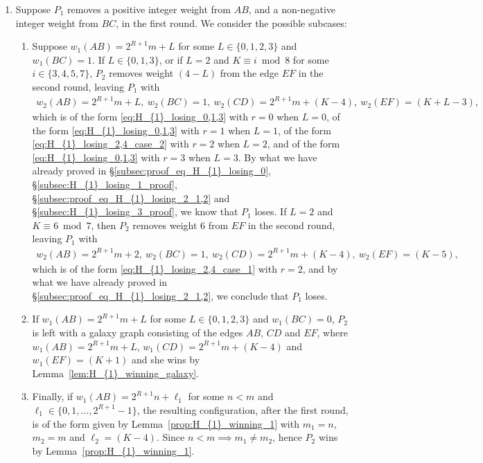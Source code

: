 \documentclass[11pt,reqno]{amsart}
\theoremstyle{definition}
\theoremstyle{definition}
\begin{document}
\begin{enumerate}
\item Suppose $P_{1}$ removes a positive integer weight from $AB$, and a non-negative integer weight from $BC$, in the first round. We consider the possible subcases:
\begin{enumerate}
\item Suppose $w_{1}(AB)=2^{R+1}m+L$ for some $L \in \{0,1,2,3\}$ and $w_{1}(BC)=1$. If $L \in \{0,1,3\}$, or if $L=2$ and $K \equiv i \bmod 8$ for some $i \in \{3,4,5,7\}$, $P_{2}$ removes weight $(4-L)$ from the edge $EF$ in the second round, leaving $P_{1}$ with
\begin{align}
w_{2}(AB)=2^{R+1}m+L,\ w_{2}(BC)=1,\ w_{2}(CD)=2^{R+1}m+(K-4),\ w_{2}(EF)=(K+L-3),\nonumber
\end{align}
which is of the form \eqref{eq:H_{1}_losing_0,1,3} with $r=0$ when $L=0$, of the form \eqref{eq:H_{1}_losing_0,1,3} with $r=1$ when $L=1$, of the form \eqref{eq:H_{1}_losing_2,4_case_2} with $r=2$ when $L=2$, and of the form \eqref{eq:H_{1}_losing_0,1,3} with $r=3$ when $L=3$. By what we have already proved in \S\ref{subsec:proof_eq_H_{1}_losing_0}, \S\ref{subsec:H_{1}_losing_1_proof}, \S\ref{subsec:proof_eq_H_{1}_losing_2_1,2} and \S\ref{subsec:H_{1}_losing_3_proof}, we know that $P_{1}$ loses. If $L=2$ and $K \equiv 6 \bmod 7$, then $P_{2}$ removes weight $6$ from $EF$ in the second round, leaving $P_{1}$ with
\begin{align}
w_{2}(AB)=2^{R+1}m+2,\ w_{2}(BC)=1,\ w_{2}(CD)=2^{R+1}m+(K-4),\ w_{2}(EF)=(K-5),\nonumber
\end{align}
which is of the form \eqref{eq:H_{1}_losing_2,4_case_1} with $r=2$, and by what we have already proved in \S\ref{subsec:proof_eq_H_{1}_losing_2_1,2}, we conclude that $P_{1}$ loses.

\item If $w_{1}(AB)=2^{R+1}m+L$ for some $L \in \{0,1,2,3\}$ and $w_{1}(BC)=0$, $P_{2}$ is left with a galaxy graph consisting of the edges $AB$, $CD$ and $EF$, where $w_{1}(AB)=2^{R+1}m+L$, $w_{1}(CD)=2^{R+1}m+(K-4)$ and $w_{1}(EF)=(K+1)$ and she wins by Lemma~\ref{lem:H_{1}_winning_galaxy}.

\item Finally, if $w_{1}(AB)=2^{R+1}n+\ell_{1}$ for some $n < m$ and $\ell_{1} \in \{0,1,\ldots,2^{R+1}-1\}$, the resulting configuration, after the first round, is of the form given by Lemma~\ref{prop:H_{1}_winning_1} with $m_{1}=n$, $m_{2}=m$ and $\ell_{2}=(K-4)$. Since $n<m \implies m_{1}\neq m_{2}$, hence $P_{2}$ wins by Lemma~\ref{prop:H_{1}_winning_1}.
\end{enumerate}


\end{enumerate}
\end{document}
